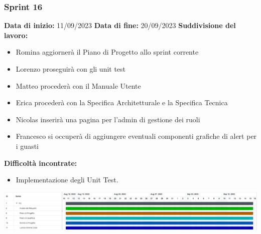 \documentclass[a4paper, 12pt]{article}
\begin{document}
\subsubsection{Sprint 16}
\textbf{Data di inizio:} 11/09/2023\newline
\textbf{Data di fine:} 20/09/2023\newline
\newline
\textbf{Suddivisione del lavoro:}
\begin{itemize}
	\item Romina aggiornerà il Piano di Progetto allo sprint corrente
	\item Lorenzo proseguirà con gli unit test
	\item Matteo procederà con il Manuale Utente
	\item Erica procederà con la Specifica Architetturale e la Specifica Tecnica
	\item Nicolas inserirà una pagina per l’admin di gestione dei ruoli 
	\item Francesco si occuperà di aggiungere eventuali componenti grafiche di alert per i guasti
\end{itemize}
\textbf{Difficoltà incontrate:}
\begin{itemize}
	\item Implementazione degli Unit Test.
\end{itemize}
\includegraphics[scale=0.178]{PB_4.png}\newline
\newline
\end{document}
